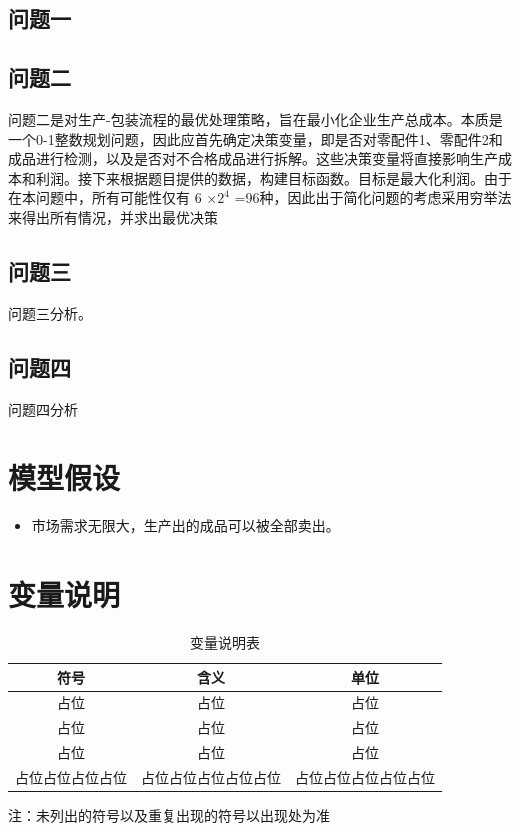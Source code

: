 \documentclass[withoutpreface,bwprint]{cumcmthesis}
\begin{document}
\subsection{问题一}


\subsection{问题二}
问题二是对生产-包装流程的最优处理策略，旨在最小化企业生产总成本。本质是一个0-1整数规划问题，因此应首先确定决策变量，即是否对零配件1、零配件2和成品进行检测，以及是否对不合格成品进行拆解。这些决策变量将直接影响生产成本和利润。接下来根据题目提供的数据，构建目标函数。目标是最大化利润。由于在本问题中，所有可能性仅有 6 $\times 2^{4}$ =96种，因此出于简化问题的考虑采用穷举法来得出所有情况，并求出最优决策

\subsection{问题三}
问题三分析。

\subsection{问题四}
问题四分析

\section{模型假设}
\begin{itemize}
    \item 市场需求无限大，生产出的成品可以被全部卖出。
\end{itemize}





\section{变量说明}
\begin{table}[htbp]
    \centering
    \begin{threeparttable}
    \caption{变量说明表}
    \begin{tabular}{ccc}
        \toprule
        符号 & 含义 & 单位 \\
        \midrule
        占位 & 占位 & 占位 \\
        占位 & 占位 & 占位 \\
        占位 & 占位 & 占位 \\
        占位占位占位占位 & 占位占位占位占位占位 & 占位占位占位占位占位 \\
        \bottomrule
    \end{tabular}
    \begin{tablenotes}
        \item 注：未列出的符号以及重复出现的符号以出现处为准
    \end{tablenotes}
    \end{threeparttable}
\end{table}
\end{document}

